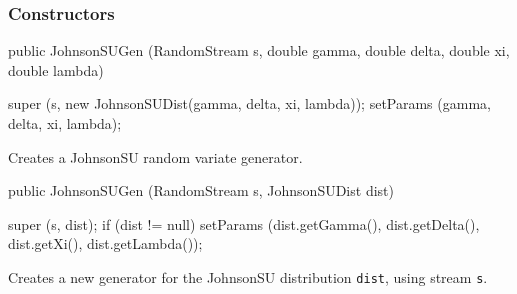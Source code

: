\subsubsection* {Constructors}
\begin{code}

   public JohnsonSUGen (RandomStream s, double gamma, double delta,
                        double xi, double lambda) \begin{hide} {
      super (s, new JohnsonSUDist(gamma, delta, xi, lambda));
      setParams (gamma, delta, xi, lambda);
   }\end{hide}
\end{code} 
\begin{tabb} Creates a JohnsonSU random variate generator.
\end{tabb}
\begin{code}

   public JohnsonSUGen (RandomStream s, JohnsonSUDist dist) \begin{hide} {
      super (s, dist);
      if (dist != null)
         setParams (dist.getGamma(), dist.getDelta(), dist.getXi(),
                     dist.getLambda());
   } \end{hide}
\end{code}
 \begin{tabb}  Creates a new generator for the JohnsonSU 
   distribution \texttt{dist}, using stream \texttt{s}.
 \end{tabb}

